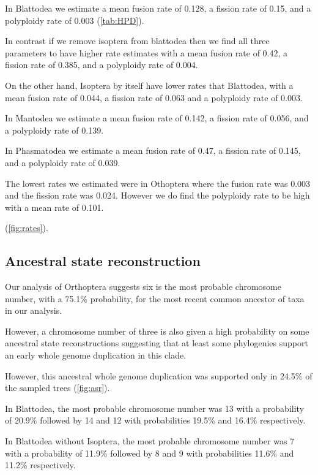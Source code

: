 In Blattodea we estimate a mean fusion rate of 0.128, a fission rate of 0.15, and a polyploidy rate of 0.003 (\cref{tab:HPD}).

In contrast if we remove isoptera from blattodea then we find all three parameters to have higher rate estimates with a mean fusion rate of 0.42, a fission rate of 0.385, and a polyploidy rate of 0.004.

On the other hand, Isoptera by itself have lower rates that Blattodea, with a mean fusion rate of 0.044, a fission rate of 0.063 and a polyploidy rate of 0.003.

In Mantodea we estimate a mean fusion rate of 0.142, a fission rate of 0.056, and a polyploidy rate of 0.139.

In Phasmatodea we estimate a mean fusion rate of 0.47, a fission rate of 0.145, and a polyploidy rate of 0.039.

The lowest rates we estimated were in Othoptera where the fusion rate was 0.003 and the fission rate was 0.024. However we do find the polyploidy rate to be high with a mean rate of 0.101.



(\cref{fig:rates}). 



\subsection{Ancestral state reconstruction}
Our analysis of Orthoptera suggests six is the most probable chromosome number, with a 75.1\% probability, for the most recent common ancestor of taxa in our analysis.

However, a chromosome number of three is also given a high probability on some ancestral state reconstructions suggesting that at least some phylogenies support an early whole genome duplication in this clade.

However, this ancestral whole genome duplication was supported only in 24.5\% of the sampled trees (\cref{fig:asr}). 

In Blattodea, the most probable chromosome number was 13 with a probability of 20.9\% followed by 14 and 12 with probabilities 19.5\% and 16.4\% respectively. 

In Blattodea without Isoptera, the most probable chromosome number was 7 with a probability of 11.9\% followed by 8 and 9 with probabilities 11.6\% and 11.2\% respectively.

